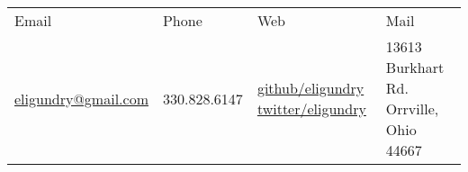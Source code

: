 \begin{tabu} to \linewidth { X X X X }
	\rowfont{\smaller\bfseries}
	Email & Phone & Web & Mail \\
	\rowfont{\smaller}
	\href{mailto:eligundry@gmail.com}{eligundry@gmail.com} &
	330.828.6147 &
	\href{https://github.com/eligundry}{github/eligundry} \newline
	\href{https://twitter.com/EliGundry}{twitter/eligundry} &
	13613 Burkhart Rd.\newline
	Orrville, Ohio 44667 \\
\end{tabu}
